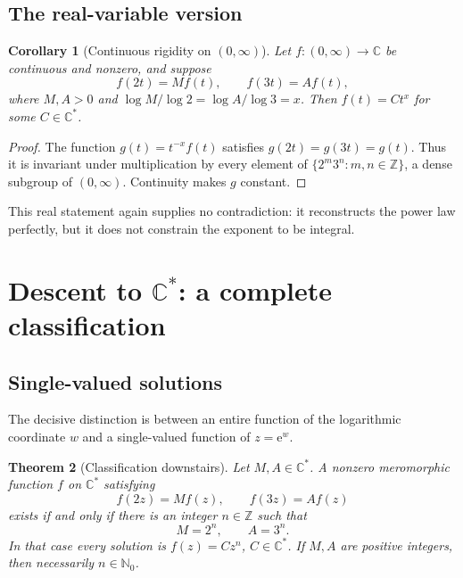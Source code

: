 \documentclass[11pt,oneside]{article}
\newtheorem{theorem}{Theorem}[section]
\newtheorem{corollary}[theorem]{Corollary}
\theoremstyle{definition}
\theoremstyle{remark}
\newcommand{\Nzero}{\mathbb N_0}
\newcommand{\Z}{\mathbb Z}
\newcommand{\C}{\mathbb C}
\newcommand{\e}{\mathrm e}
\begin{document}
\subsection{The real-variable version}

\begin{corollary}[Continuous rigidity on \((0,\infty)\)]
\label{cor:real-rigidity}
Let \(f:(0,\infty)\to\C\) be continuous and nonzero, and suppose
\[
  f(2t)=Mf(t),\qquad f(3t)=Af(t),
\]
where \(M,A>0\) and \(\log M/\log2=\log A/\log3=x\).  Then
\(f(t)=Ct^x\) for some \(C\in\C^*\).
\end{corollary}

\begin{proof}
The function \(g(t)=t^{-x}f(t)\) satisfies \(g(2t)=g(3t)=g(t)\).  Thus it is invariant under multiplication by every element of \(\{2^m3^n:m,n\in\Z\}\), a dense subgroup of \((0,\infty)\).  Continuity makes \(g\) constant.
\end{proof}

This real statement again supplies no contradiction: it reconstructs the power law perfectly, but it does not constrain the exponent to be integral.

\section{Descent to \texorpdfstring{\(\C^*\)}{C*}: a complete classification}

\subsection{Single-valued solutions}

The decisive distinction is between an entire function of the logarithmic coordinate \(w\) and a single-valued function of \(z=\e^w\).

\begin{theorem}[Classification downstairs]
\label{thm:downstairs}
Let \(M,A\in\C^*\).  A nonzero meromorphic function \(f\) on \(\C^*\) satisfying
\begin{equation}
  f(2z)=Mf(z),\qquad f(3z)=Af(z)
  \label{eq:dilation-downstairs}
\end{equation}
exists if and only if there is an integer \(n\in\Z\) such that
\[
  M=2^n,\qquad A=3^n.
\]
In that case every solution is \(f(z)=Cz^n\), \(C\in\C^*\).
If \(M,A\) are positive integers, then necessarily \(n\in\Nzero\).
\end{theorem}
\end{document}
